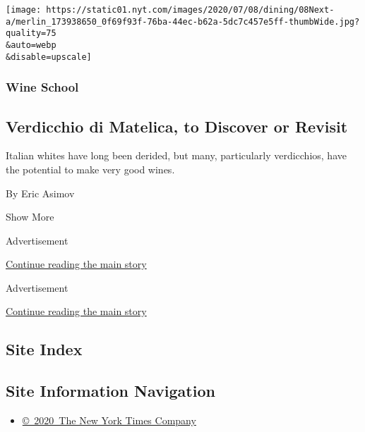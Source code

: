 \begin{enumerate}
  \texttt{[image: https://static01.nyt.com/images/2020/07/08/dining/08Next-a/merlin\_173938650\_0f69f93f-76ba-44ec-b62a-5dc7c457e5ff-thumbWide.jpg?quality=75\\\&auto=webp\\\&disable=upscale]}

  \hypertarget{wine-school-4}{%
  \subsubsection{Wine School}\label{wine-school-4}}

  \hypertarget{verdicchio-di-matelica-to-discover-or-revisit}{%
  \subsection{Verdicchio di Matelica, to Discover or
  Revisit}\label{verdicchio-di-matelica-to-discover-or-revisit}}

  Italian whites have long been derided, but many, particularly
  verdicchios, have the potential to make very good wines.

  By Eric Asimov
\end{enumerate}

Show More

Advertisement

\protect\hyperlink{after-mid2}{Continue reading the main story}

Advertisement

\protect\hyperlink{after-mktg}{Continue reading the main story}

\hypertarget{site-index}{%
\subsection{Site Index}\label{site-index}}

\hypertarget{site-information-navigation}{%
\subsection{Site Information
Navigation}\label{site-information-navigation}}

\begin{itemize}
\tightlist
\item
  \href{https://help.nytimes.com/hc/en-us/articles/115014792127-Copyright-notice}{©~2020~The
  New York Times Company}
\end{itemize}


